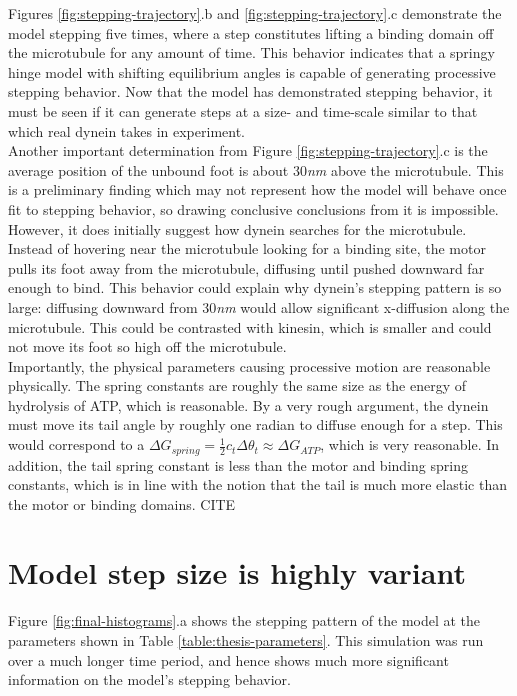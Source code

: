 \documentclass[
11pt, %
english, %
singlespacing, %
headsepline, %
chapterinoneline, %
]{MastersDoctoralThesis} %
\begin{document}
Figures \ref{fig:stepping-trajectory}.b and \ref{fig:stepping-trajectory}.c demonstrate the model stepping five times, where a step constitutes lifting a binding domain off the microtubule for any amount of time. This behavior indicates that a springy hinge model with shifting equilibrium angles is capable of generating processive stepping behavior. Now that the model has demonstrated stepping behavior, it must be seen if it can generate steps at a size- and time-scale similar to that which real dynein takes in experiment.\\

Another important determination from Figure \ref{fig:stepping-trajectory}.c is the average position of the unbound foot is about 30\textit{nm} above the microtubule. This is a preliminary finding which may not represent how the model will behave once fit to stepping behavior, so drawing conclusive conclusions from it is impossible. However, it does initially suggest how dynein searches for the microtubule. Instead of hovering near the microtubule looking for a binding site, the motor pulls its foot away from the microtubule, diffusing until pushed downward far enough to bind. This behavior could explain why dynein's stepping pattern is so large: diffusing downward from 30\textit{nm} would allow significant x-diffusion along the microtubule. This could be contrasted with kinesin, which is smaller and could not move its foot so high off the microtubule.\\

Importantly, the physical parameters causing processive motion are reasonable physically. The spring constants are roughly the same size as the energy of hydrolysis of ATP, which is reasonable. By a very rough argument, the dynein must move its tail angle by roughly one radian to diffuse enough for a step. This would correspond to a $\Delta G_{spring} = \frac{1}{2}c_t\Delta \theta_t \approx \Delta G_{ATP}$, which is very reasonable. In addition, the tail spring constant is less than the motor and binding spring constants, which is in line with the notion that the tail is much more elastic than the motor or binding domains. CITE\\

\section{Model step size is highly variant}
Figure \ref{fig:final-histograms}.a shows the stepping pattern of the model at the parameters shown in Table \ref{table:thesis-parameters}. This simulation was run over a much longer time period, and hence shows much more significant information on the model's stepping behavior.\\
\end{document}
